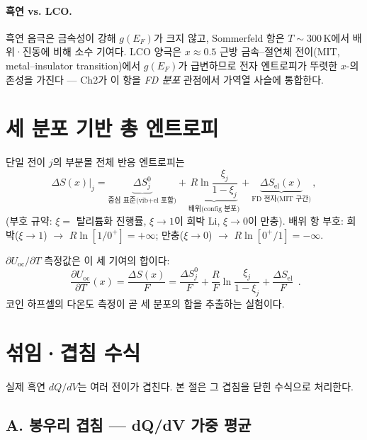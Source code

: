\documentclass[11pt,a4paper]{article}
\newcommand{\oc}{\mathrm{oc}}
\newcommand{\el}{\mathrm{el}}
\begin{document}
\paragraph{흑연 vs. LCO.}
흑연 음극은 금속성이 강해 $g(E_F)$가 크지 않고,
Sommerfeld 항은 $T\sim300$\,K에서 배위·진동에 비해 소수 기여다.
LCO 양극은 $x\approx0.5$ 근방 금속--절연체 전이(MIT, metal--insulator transition)에서
$g(E_F)$가 급변하므로 전자 엔트로피가 뚜렷한 $x$-의존성을 가진다
--- Ch2가 이 항을 \emph{FD 분포} 관점에서 가역열 사슬에 통합한다.

\section{세 분포 기반 총 엔트로피}\label{sec:total}

단일 전이 $j$의 부분몰 전체 반응 엔트로피는
\begin{equation}
  \Delta S(x)\big|_j = \underbrace{\Delta S^0_j}_{\text{중심 표준(vib+el 포함)}}
    + \underbrace{R\ln\!\frac{\xi_j}{1-\xi_j}}_{\text{배위(config 분포)}}
    + \underbrace{\Delta S_\el(x)}_{\text{FD 전자(MIT 구간)}}\,,
  \label{eq:total_entropy}
\end{equation}
(부호 규약: $\xi=$ 탈리튬화 진행률, $\xi\to1$이 희박 Li, $\xi\to0$이 만충).\;
배위 항 부호: 희박($\xi\to1$) $\to$ $R\ln[1/0^+]=+\infty$;
만충($\xi\to0$) $\to$ $R\ln[0^+/1]=-\infty$.

$\partial U_{\oc}/\partial T$ 측정값은 이 세 기여의 합이다:
\begin{equation}
  \boxed{\;\frac{\partial U_{\oc}}{\partial T}(x)
    =\frac{\Delta S(x)}{F}
    =\frac{\Delta S^0_j}{F}+\frac{R}{F}\ln\frac{\xi_j}{1-\xi_j}
      +\frac{\Delta S_\el}{F}\;}\,.
  \label{eq:dUdT_total}
\end{equation}
코인 하프셀의 다온도 측정이 곧 세 분포의 합을 추출하는 실험이다.

\section{섞임·겹침 수식}\label{sec:mixing}

실제 흑연 $dQ/dV$는 여러 전이가 겹친다.
본 절은 그 겹침을 닫힌 수식으로 처리한다.

\subsection{A. 봉우리 겹침 --- dQ/dV 가중 평균}\label{sec:mixing_A}
\end{document}
